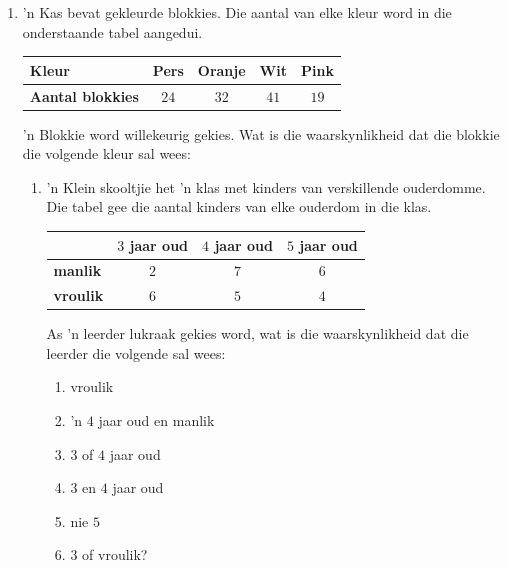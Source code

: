 \begin{exercises}{}
{
  \begin{enumerate}[itemsep=3pt, label=\textbf{\arabic*}.]
  \item  'n Kas bevat gekleurde blokkies. Die aantal van elke kleur word in die onderstaande tabel aangedui.

  \begin{center}
      \begin{tabular}{|l|c|c|c|c|}
        \hline
        \textbf{Kleur} & Pers & Oranje & Wit & Pink \\ \hline
       
        \textbf{Aantal blokkies} & $24$ & $32$ & $41$ & $19$ \\ \hline
   
      \end{tabular}
    \end{center}
    'n Blokkie word willekeurig gekies. Wat is die waarskynlikheid dat die blokkie die volgende kleur sal wees:
    \begin{enumerate}\begin{enumerate}[noitemsep, label=\textbf{(\alph*)} ]
    \item pers
    \item pers of wit
    \item pienk en oranje
    \item nie oranje?
    \end{enumerate}

  \item 'n Klein skooltjie het 'n klas met kinders van verskillende ouderdomme. Die tabel gee die aantal kinders van elke ouderdom in die klas.

    \begin{center}
      \begin{tabular}{|l|c|c|c|}
        \hline
               & $3$ jaar oud & $4$ jaar oud & $5$ jaar oud \\\hline
   
        \textbf{manlik}   & $2$ & $7$ & $6$ \\\hline
        \textbf{vroulik} & $6$ & $5$ & $4$ \\\hline
       
      \end{tabular}
    \end{center}

    As 'n leerder lukraak gekies word, wat is die waarskynlikheid dat die leerder die volgende sal wees:
    \begin{enumerate}\begin{enumerate}[noitemsep, label=\textbf{(\alph*)} ]
    \item vroulik
    \item 'n $4$ jaar oud en manlik 
    \item $3$ of $4$ jaar oud
    \item $3$ en $4$ jaar oud
    \item nie $5$
    \item $3$ of vroulik?
    \end{enumerate}


\end{enumerate}
\end{enumerate}
\end{enumerate}}
\end{exercises}
